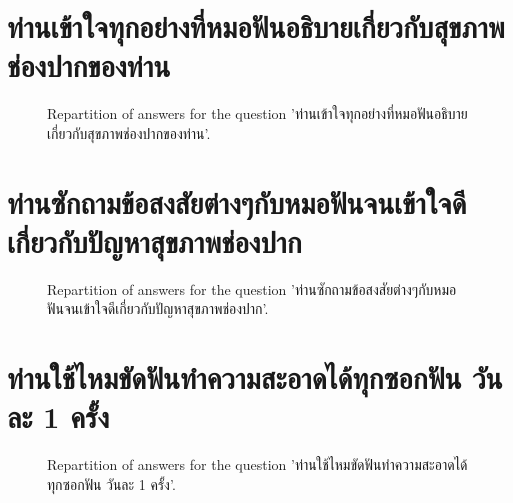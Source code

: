 \documentclass[12pt]{article}
\begin{document}
\clearpage{}
\section{ท่านเข้าใจทุกอย่างที่หมอฟันอธิบายเกี่ยวกับสุขภาพช่องปากของท่าน}

\label{sec:93}


\begin{figure}[h!]
    \caption{\label{figure:q93-1}Repartition of answers for the question 'ท่านเข้าใจทุกอย่างที่หมอฟันอธิบายเกี่ยวกับสุขภาพช่องปากของท่าน'.}
\end{figure}



\clearpage{}
\section{ท่านซักถามข้อสงสัยต่างๆกับหมอฟันจนเข้าใจดีเกี่ยวกับปัญหาสุขภาพช่องปาก}

\label{sec:94}


\begin{figure}[h!]
    \caption{\label{figure:q94-1}Repartition of answers for the question 'ท่านซักถามข้อสงสัยต่างๆกับหมอฟันจนเข้าใจดีเกี่ยวกับปัญหาสุขภาพช่องปาก'.}
\end{figure}



\clearpage{}
\section{ท่านใช้ไหมขัดฟันทำความสะอาดได้ทุกซอกฟัน วันละ 1 ครั้ง}

\label{sec:95}


\begin{figure}[h!]
    \caption{\label{figure:q95-1}Repartition of answers for the question 'ท่านใช้ไหมขัดฟันทำความสะอาดได้ทุกซอกฟัน วันละ 1 ครั้ง'.}
\end{figure}
\end{document}
